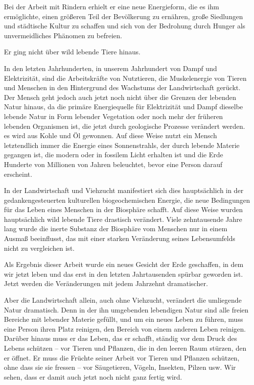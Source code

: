 \documentclass[11pt,a4paper]{book}
\begin{document}
Bei der Arbeit mit Rindern erhielt er eine neue Energieform, die es ihm ermöglichte, einen größeren Teil der Bevölkerung zu ernähren, große Siedlungen und städtische Kultur zu schaffen und sich von der Bedrohung durch Hunger als unvermeidliches Phänomen zu befreien.



Er ging nicht über wild lebende Tiere hinaus.



In den letzten Jahrhunderten, in unserem Jahrhundert von Dampf und Elektrizität, sind die Arbeitskräfte von Nutztieren, die Muskelenergie von Tieren und Menschen in den Hintergrund des Wachstums der Landwirtschaft gerückt. Der Mensch geht jedoch auch jetzt noch nicht über die Grenzen der lebenden Natur hinaus, da die primäre Energiequelle für Elektrizität und Dampf dieselbe lebende Natur in Form lebender Vegetation oder noch mehr der früheren lebenden Organismen ist, die jetzt durch geologische Prozesse verändert werden. es wird aus Kohle und Öl gewonnen. Auf diese Weise nutzt ein Mensch letztendlich immer die Energie eines Sonnenstrahls, der durch lebende Materie gegangen ist, die modern oder in fossilem Licht erhalten ist und die Erde Hunderte von Millionen von Jahren beleuchtet, bevor eine Person darauf erscheint.



In der Landwirtschaft und Viehzucht manifestiert sich dies hauptsächlich in der gedankengesteuerten kulturellen biogeochemischen Energie, die neue Bedingungen für das Leben eines Menschen in der Biosphäre schafft. Auf diese Weise wurden hauptsächlich wild lebende Tiere drastisch verändert. Viele zehntausende Jahre lang wurde die inerte Substanz der Biosphäre vom Menschen nur in einem Ausmaß beeinflusst, das mit einer starken Veränderung seines Lebensumfelds nicht zu vergleichen ist.



Als Ergebnis dieser Arbeit wurde ein neues Gesicht der Erde geschaffen, in dem wir jetzt leben und das erst in den letzten Jahrtausenden spürbar geworden ist. Jetzt werden die Veränderungen mit jedem Jahrzehnt dramatischer.



Aber die Landwirtschaft allein, auch ohne Viehzucht, verändert die umliegende Natur dramatisch. Denn in der ihn umgebenden lebendigen Natur sind alle freien Bereiche mit lebender Materie gefüllt, und um ein neues Leben zu führen, muss eine Person ihren Platz reinigen, den Bereich von einem anderen Leben reinigen. Darüber hinaus muss er das Leben, das er schafft, ständig vor dem Druck des Lebens schützen -- vor Tieren und Pflanzen, die in den leeren Raum stürzen, den er öffnet. Er muss die Früchte seiner Arbeit vor Tieren und Pflanzen schützen, ohne dass sie sie fressen -- vor Säugetieren, Vögeln, Insekten, Pilzen usw. Wir sehen, dass er damit auch jetzt noch nicht ganz fertig wird.
\end{document}
